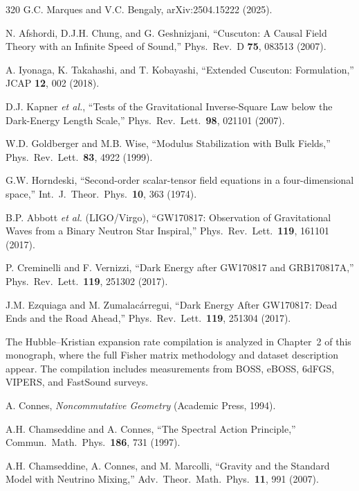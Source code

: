 \begin{thebibliography}{320}
G.C. Marques and V.C. Bengaly,
arXiv:2504.15222 (2025).

N. Afshordi, D.J.H. Chung, and G. Geshnizjani,
``Cuscuton: A Causal Field Theory with an Infinite Speed of Sound,''
Phys.\ Rev.\ D \textbf{75}, 083513 (2007).

A. Iyonaga, K. Takahashi, and T. Kobayashi,
``Extended Cuscuton: Formulation,''
JCAP \textbf{12}, 002 (2018).

D.J. Kapner \textit{et al.},
``Tests of the Gravitational Inverse-Square Law below the Dark-Energy Length Scale,''
Phys.\ Rev.\ Lett.\ \textbf{98}, 021101 (2007).

W.D. Goldberger and M.B. Wise,
``Modulus Stabilization with Bulk Fields,''
Phys.\ Rev.\ Lett.\ \textbf{83}, 4922 (1999).

G.W. Horndeski,
``Second-order scalar-tensor field equations in a four-dimensional space,''
Int.\ J.\ Theor.\ Phys.\ \textbf{10}, 363 (1974).

B.P. Abbott \textit{et al.} (LIGO/Virgo),
``GW170817: Observation of Gravitational Waves from a Binary Neutron Star Inspiral,''
Phys.\ Rev.\ Lett.\ \textbf{119}, 161101 (2017).

P. Creminelli and F. Vernizzi,
``Dark Energy after GW170817 and GRB170817A,''
Phys.\ Rev.\ Lett.\ \textbf{119}, 251302 (2017).

J.M. Ezquiaga and M. Zumalac\'{a}rregui,
``Dark Energy After GW170817: Dead Ends and the Road Ahead,''
Phys.\ Rev.\ Lett.\ \textbf{119}, 251304 (2017).

The Hubble--Kristian expansion rate compilation is analyzed in Chapter~2 of this monograph, where the full Fisher matrix methodology and dataset description appear. The compilation includes measurements from BOSS, eBOSS, 6dFGS, VIPERS, and FastSound surveys.

A. Connes,
\textit{Noncommutative Geometry} (Academic Press, 1994).

A.H. Chamseddine and A. Connes,
``The Spectral Action Principle,''
Commun.\ Math.\ Phys.\ \textbf{186}, 731 (1997).

A.H. Chamseddine, A. Connes, and M. Marcolli,
``Gravity and the Standard Model with Neutrino Mixing,''
Adv.\ Theor.\ Math.\ Phys.\ \textbf{11}, 991 (2007).


\end{thebibliography}
